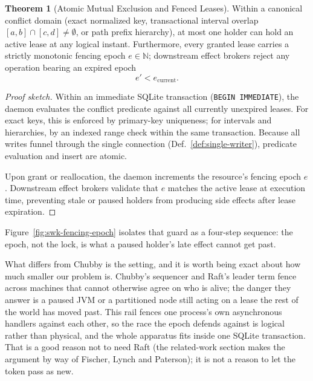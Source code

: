 \documentclass[11pt,a4paper]{article}
\theoremstyle{definition}
\newtheorem{theorem}{Theorem}[section]
\theoremstyle{remark}
\begin{document}
\begin{theorem}[Atomic Mutual Exclusion and Fenced Leases]\label{thm:exclusion}
\setlength{\parskip}{4pt plus 1pt}
Within a canonical conflict domain (exact normalized key, transactional interval overlap $[a, b] \cap [c, d] \neq \emptyset$, or path prefix hierarchy), at most one holder can hold an active lease at any logical instant.
Furthermore, every granted lease carries a strictly monotonic fencing epoch $e \in \mathbb{N}$; downstream effect brokers reject any operation bearing an expired epoch
\[
e' < e_{\text{current}}.
\]
\end{theorem}

\begin{proof}[Proof sketch]
\setlength{\parskip}{4pt plus 1pt}
Within an immediate SQLite transaction (\texttt{BEGIN IMMEDIATE}), the daemon evaluates the conflict predicate against all currently unexpired leases. For exact keys, this is enforced by primary-key uniqueness; for intervals and hierarchies, by an indexed range check within the same transaction. Because all writes funnel through the single connection (Def.~\ref{def:single-writer}), predicate evaluation and insert are atomic.

Upon grant or reallocation, the daemon increments the resource's fencing epoch $e$. Downstream effect brokers validate that $e$ matches the active lease at execution time, preventing stale or paused holders from producing side effects after lease expiration.
\end{proof}



Figure~\ref{fig:swk-fencing-epoch} isolates that guard as a four-step
sequence: the epoch, not the lock, is what a paused holder's late effect
cannot get past.

%

What differs from Chubby is the setting, and it is worth being exact about how
much smaller our problem is. Chubby's sequencer and Raft's leader term fence
across machines that cannot otherwise agree on who is alive; the danger they
answer is a paused JVM or a partitioned node still acting on a lease the rest
of the world has moved past. This rail fences one process's own asynchronous
handlers against each other, so the race the epoch defends against is logical
rather than physical, and the whole apparatus fits inside one SQLite
transaction. That is a good reason not to need Raft (the related-work section
makes the argument by way of Fischer, Lynch and Paterson); it is not a reason
to let the token pass as new.
\end{document}
